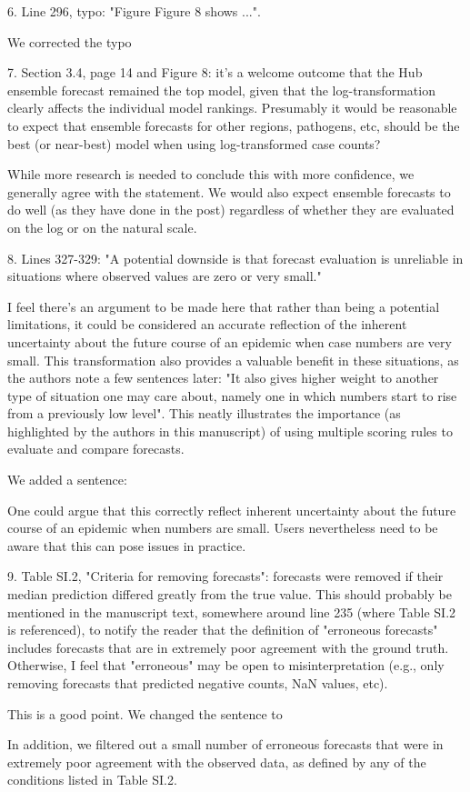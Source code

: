\documentclass{article}
\newcommand{\black}{\color{black}}
\newcommand{\blue}{\color{blue}}
\begin{document}
\blue
6. Line 296, typo: "Figure Figure 8 shows ...".

\black
We corrected the typo

\blue
7. Section 3.4, page 14 and Figure 8: it's a welcome outcome that the Hub ensemble forecast remained the top model, given that the log-transformation clearly affects the individual model rankings. Presumably it would be reasonable to expect that ensemble forecasts for other regions, pathogens, etc, should be the best (or near-best) model when using log-transformed case counts?

\black
While more research is needed to conclude this with more confidence, we generally agree with the statement. We would also expect ensemble forecasts to do well (as they have done in the post) regardless of whether they are evaluated on the log or on the natural scale. 

\blue
8. Lines 327-329: "A potential downside is that forecast evaluation is unreliable in situations where observed values are zero or very small."

I feel there's an argument to be made here that rather than being a potential limitations, it could be considered an accurate reflection of the inherent uncertainty about the future course of an epidemic when case numbers are very small. This transformation also provides a valuable benefit in these situations, as the authors note a few sentences later: "It also gives higher weight to another type of situation one may care about, namely one in which numbers start to rise from a previously low level". This neatly illustrates the importance (as highlighted by the authors in this manuscript) of using multiple scoring rules to evaluate and compare forecasts.

\black
We added a sentence: 

One could argue that this correctly reflect inherent uncertainty about the future course of an epidemic when numbers are small. Users nevertheless need to be aware that this can pose issues in practice. 

\blue

9. Table SI.2, "Criteria for removing forecasts": forecasts were removed if their median prediction differed greatly from the true value. This should probably be mentioned in the manuscript text, somewhere around line 235 (where Table SI.2 is referenced), to notify the reader that the definition of "erroneous forecasts" includes forecasts that are in extremely poor agreement with the ground truth. Otherwise, I feel that "erroneous" may be open to misinterpretation (e.g., only removing forecasts that predicted negative counts, NaN values, etc).

\black
This is a good point. We changed the sentence to 

In addition, we filtered out a small number of erroneous forecasts that were in extremely poor agreement with the observed data, as defined by any of the conditions listed in Table SI.2. 







\clearpage

\end{document}
